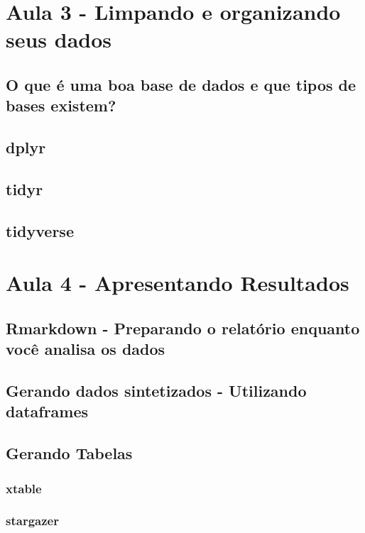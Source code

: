 \documentclass[12pt,a4paper,oneside]{erdc}
\begin{document}
\chapter{Aula 3 - Limpando e organizando seus dados}

\section{O que é uma boa base de dados e que tipos de bases existem?}

\section{dplyr}

\section{tidyr}

\section{tidyverse}

\chapter{Aula 4 - Apresentando Resultados}

\section{Rmarkdown - Preparando o relatório enquanto você analisa os dados}

\section{Gerando dados sintetizados - Utilizando dataframes}

\section{Gerando Tabelas}

\subsection{xtable}

\subsection{stargazer}
\end{document}
